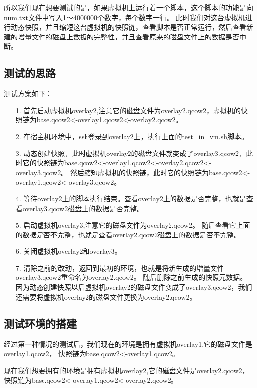 \documentclass[a4paper,left=1.5cm,right=1.5cm,11pt]{article}
\begin{document}
	所以我们现在想要测试的是，如果虚拟机上运行着一个脚本，这个脚本的功能是向num.txt文件中写入1～4000000个数字，每个数字一行。
	此时我们对这台虚拟机进行动态快照，并且缩短这台虚拟机的快照链，查看脚本是否正常运行，然后查看新建的增量文件的磁盘上数据的完整性，并且查看原来的磁盘文件上的数据是否中断。\par

\subsection{测试的思路}
	测试方案如下：
	\begin{itemize}
		\item[1.] 首先启动虚拟机overlay2,注意它的磁盘文件为overlay2.qcow2，虚拟机的快照链为base.qcow2<-overlay1.qcow2<-overlay2.qcow2。
		\item[2.] 在宿主机环境中，ssh登录到overlay2上，执行上面的test\_in\_vm.sh脚本。
		\item[3.] 动态创建快照，此时虚拟机overlay2的磁盘文件就变成了overlay3.qcow2，此时它的快照链为base.qcow2<-overlay1.qcow2<-overlay2.qcow2<-overlay3.qcow2。
				  然后缩短虚拟机的快照链，此时它的快照链为base.qcow2<-overlay1.qcow2<-overlay3.qcow2。
		\item[4.] 等待overlay2上的脚本执行结束。查看overlay2上的数据是否完整，也就是查看overlay3.qcow2磁盘上的数据是否完整。
		\item[5.] 启动虚拟机overlay3,注意它的磁盘文件为overlay2.qcow2。
				  随后查看它上面的数据是否不完整，也就是查看overlay2.qcow2磁盘上的数据是否不完整。
		\item[6.] 关闭虚拟机overlay2和overlay3。
		\item[7.] 清除之前的改动，返回到最初的环境，也就是将新生成的增量文件overlay3.qcow2重命名为overlay2.qcow2。
		          随后删除之前生成的快照元数据。因为动态创建快照以后虚拟机overlay2的磁盘文件变成了overlay3.qcow2，我们还需要将虚拟机overlay2的磁盘文件更换为overlay2.qcow2。
	\end{itemize}

\subsection{测试环境的搭建}
	经过第一种情况的测试后，我们现在的环境是拥有虚拟机overlay1,它的磁盘文件是overlay1.qcow2，
	快照链为base.qcow2<-overlay1.qcow2。\par

	现在我们想要拥有的环境是拥有虚拟机overlay2,它的磁盘文件是overlay2.qcow2，
	快照链为base.qcow2<-overlay1.qcow2<-overlay2.qcow2。\par
\end{document}
